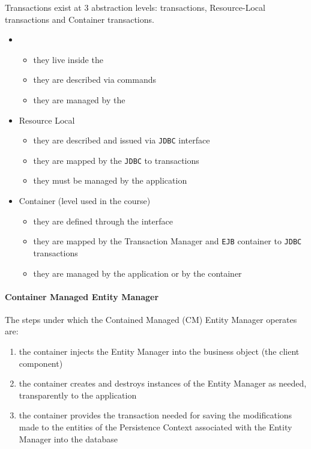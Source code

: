 \documentclass[english]{article}
\begin{document}
Transactions exist at \(3\) abstraction levels: \dbms transactions, Resource-Local transactions and Container transactions.

\begin{itemize}
  \item \dbms
        \begin{itemize}
          \item they live inside the \dbms
          \item they are described via \sql commands
          \item they are managed by the \dbms
        \end{itemize}
  \item Resource Local
        \begin{itemize}
          \item they are described and issued via \texttt{JDBC} interface
          \item they are mapped by the \texttt{JDBC} to \dbms transactions
          \item they must be managed by the application
        \end{itemize}
  \item Container (level used in the course)
        \begin{itemize}
          \item they are defined through the \jta interface
          \item they are mapped by the \jta Transaction Manager and \texttt{EJB} container to \texttt{JDBC} transactions
          \item they are managed by the application or by the container
        \end{itemize}
\end{itemize}

\paragraph{Container Managed Entity Manager}

The steps under which the Contained Managed (CM) Entity Manager operates are:
\begin{enumerate}
  \item the container injects the Entity Manager into the business object (the client component)
  \item the container creates and destroys instances of the Entity Manager as needed, transparently to the application
  \item the container provides the transaction needed for saving the modifications made to the entities of the Persistence Context associated with the Entity Manager into the database
\end{enumerate}
\end{document}
